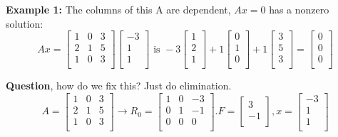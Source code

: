 \textbf{Example 1: } The columns of this A are dependent, \(Ax = 0\)  has a nonzero solution: 
\[
    Ax = 
    \begin{bmatrix}
        1 & 0 & 3  \\
        2 & 1 & 5  \\
        1 & 0 & 3  \\
    \end{bmatrix}
    \begin{bmatrix}
         -3 \\
         1 \\
         1 \\
    \end{bmatrix}
    \text{ is }
    -3 \begin{bmatrix}
         1 \\
         2 \\
         1 \\
    \end{bmatrix}
    +
    1 \begin{bmatrix}
         0 \\
         1 \\
         0 \\
    \end{bmatrix}
    +
    1 \begin{bmatrix}
         3 \\
         5 \\
         3 \\
    \end{bmatrix} 
    = 
    \begin{bmatrix}
         0 \\
         0 \\
         0 \\
    \end{bmatrix}
\]  

\textbf{Question}, how do we fix this? Just do elimination.
\[
    A = 
    \begin{bmatrix}
        1 & 0 & 3  \\
        2 & 1 & 5  \\
        1 & 0 & 3  \\
    \end{bmatrix}
    \rightarrow
    R_0 = 
    \begin{bmatrix}
        1 & 0 & -3  \\
        0 & 1 & -1  \\
        0 & 0 & 0  \\
    \end{bmatrix}
    . 
    F = 
    \begin{bmatrix}
         3 \\
         -1 \\
    \end{bmatrix}
    , x = 
    \begin{bmatrix}
         -3 \\
         1 \\
         1 \\
    \end{bmatrix}
\]

